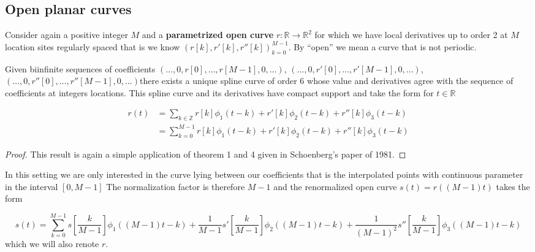 \documentclass[a4paper, 11pt]{article}
\begin{document}
\subsection{Open planar curves}

Consider again a positive integer $M$ and a \textbf{parametrized open curve} $r: \mathbb{R} \to \mathbb{R}^2$ for which 
we have local derivatives up to order 2 at $M$ location sites regularly spaced that is we know ${(r[k], r'[k], 
r''[k])}_{k=0}^{M-1}$. By “open” we mean a curve that is not periodic. 

\begin{cor}{2}
  Given biinfinite sequences of coefficients $(\dots, 0, r[0], \dots, r[M-1], 0, \dots)$, $(\dots, 0, r'[0], \dots, 
  r'[M-1], 0, \dots)$, $(\dots, 0, r''[0], \dots, r''[M-1], 0, \dots)$there exists a unique spline curve of order $6$ 
  whose value and derivatives agree with the sequence of coefficients at integers locations. This spline curve and its 
  derivatives have compact support and take the form for $t \in \mathbb{R}$

  \begin{align*}
    r(t) &= \sum_{k \in \mathbb{Z}} r[k] \phi_1(t-k) + r'[k] \phi_2(t-k) + r''[k] \phi_3(t-k) \\
    &= \sum_{k=0}^{M-1} r[k] \phi_{1}(t-k) + r'[k] \phi_{2}(t-k) + r''[k] \phi_{3}(t-k)
  \end{align*}
\end{cor}

\begin{proof}
  This result is again a simple application of theorem 1 and 4 given in Schoenberg's paper of 1981.
\end{proof}

\begin{remark}{2}
  In this setting we are only interested in the curve lying between our coefficients that is the interpolated points 
  with continuous parameter in the interval $[0, M-1]$  The normalization factor is therefore $M-1$ and the renormalized 
  open curve $s(t) = r((M-1)t)$ takes the form

  \begin{equation}
    \label{eq:ocurve_no}
    s(t) = \sum_{k=0}^{M-1} s[\frac{k}{M-1}] \phi_{1}((M-1)t-k) + \frac{1}{M-1} s'[\frac{k}{M-1}] \phi_{2}((M-1)t-k) + 
  \frac{1}{(M-1)^2} s''[\frac{k}{M-1}] \phi_{3}((M-1)t-k)
  \end{equation}
  which we will also renote $r$.
\end{remark}
\end{document}
